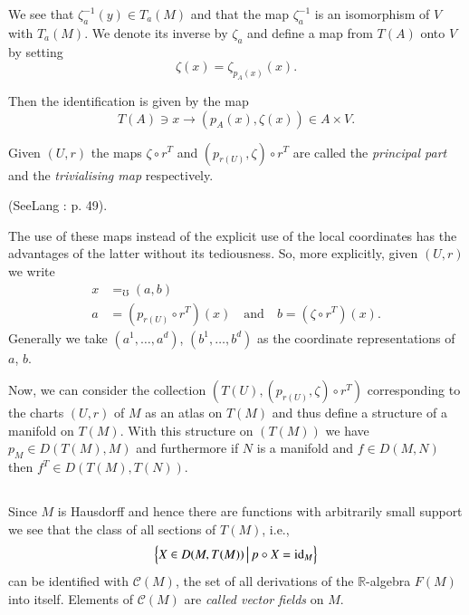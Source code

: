 We see that $\zeta^{-1}_{a}(y)\in T_{a}(M)$ and that the map
$\zeta^{-1}_{a}$ is an isomorphism of $V$ with $T_{a}(M)$. We denote
its inverse by $\zeta_{a}$ and define a map from $T(A)$ onto $V$ by
setting
\begin{equation*}\label{chap0:0.1.8}
\zeta(x)=\zeta_{p_{A}(x)}(x).\tag{0.1.8}
\end{equation*}

Then the identification is given by the map
\begin{equation*}\label{chap0:0.1.9}
T(A)\ni x\to (p_{A}(x), \zeta(x))\in A\times V.\tag{0.1.9}
\end{equation*}

Given $(U,r)$ the maps $\zeta\circ r^{T}$ and $(p_{r(U)},\zeta)\circ
r^{T}$ are called the {\em principal part} and the {\em trivialising
  map} respectively.

(See\pageoriginale Lang \cite{19} : p. 49).

The use of these maps instead of the explicit use of the local
coordinates has the advantages of the latter without its
tediousness. So, more explicitly, given $(U,r)$ we write
\begin{align*}
x &\mathop{=}_{\mho} (a,b)\\
a &= (p_{r(U)}\circ r^{T})(x)\quad \text{and}\quad b=(\zeta\circ
r^{T})(x).
\end{align*}
Generally we take $(a^{1},\ldots,a^{d})$, $(b^{1},\ldots,b^{d})$ as
the coordinate representations of $a$, $b$.

Now, we can consider the collection $(T(U),(p_{r(U)},\zeta)\circ
r^{T})$ corresponding to the charts $(U,r)$ of $M$ as an atlas on
$T(M)$ and thus define a structure of a manifold on $T(M)$. With this
structure on $(T(M))$ we have $p_{M}\in D(T(M),M)$ and furthermore if
$N$ is a manifold and $f\in D(M,N)$ then $f^{T}\in D(T(M),T(N))$.

\setcounter{subsection}{9}
\subsection{}\label{chap0:0.1.10}

Since $M$ is Hausdorff and hence there are functions with arbitrarily
small support we see that the class of all sections of $T(M)$, i.e.,
$$
\left\{X\in D(M,T(M)) \, \big|\, p\circ X=\operatorname{id}_{M}\right\}
$$
can be identified with $\mathscr{C}(M)$, the set of all derivations of
the $\mathbb{R}$-algebra $F(M)$ into itself. Elements of
$\mathscr{C}(M)$ are {\em called vector fields} on $M$.

